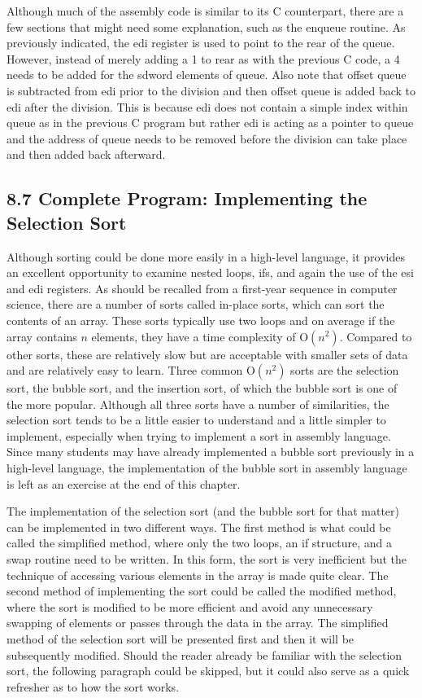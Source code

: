 \documentclass[10pt]{book}
\begin{document}
Although much of the assembly code is similar to its C counterpart, there are a few sections that might need some explanation, such as the enqueue routine. As previously indicated, the edi register is used to point to the rear of the queue. However, instead of merely adding a 1 to rear as with the previous C code, a 4\\

needs to be added for the sdword elements of queue. Also note that offset queue is subtracted from edi prior to the division and then offset queue is added back to edi after the division. This is because edi does not contain a simple index within queue as in the previous C program but rather edi is acting as a pointer to queue and the address of queue needs to be removed before the division can take place and then added back afterward.


\subsection*{8.7 Complete Program: Implementing the Selection Sort}
Although sorting could be done more easily in a high-level language, it provides an excellent opportunity to examine nested loops, ifs, and again the use of the esi and edi registers. As should be recalled from a first-year sequence in computer science, there are a number of sorts called in-place sorts, which can sort the contents of an array. These sorts typically use two loops and on average if the array contains $n$ elements, they have a time complexity of $\mathrm{O}\left(n^{2}\right)$. Compared to other sorts, these are relatively slow but are acceptable with smaller sets of data and are relatively easy to learn. Three common $\mathrm{O}\left(n^{2}\right)$ sorts are the selection sort, the bubble sort, and the insertion sort, of which the bubble sort is one of the more popular. Although all three sorts have a number of similarities, the selection sort tends to be a little easier to understand and a little simpler to implement, especially when trying to implement a sort in assembly language. Since many students may have already implemented a bubble sort previously in a high-level language, the implementation of the bubble sort in assembly language is left as an exercise at the end of this chapter.

The implementation of the selection sort (and the bubble sort for that matter) can be implemented in two different ways. The first method is what could be called the simplified method, where only the two loops, an if structure, and a swap routine need to be written. In this form, the sort is very inefficient but the technique of accessing various elements in the array is made quite clear. The second method of implementing the sort could be called the modified method, where the sort is modified to be more efficient and avoid any unnecessary swapping of elements or passes through the data in the array. The simplified method of the selection sort will be presented first and then it will be subsequently modified. Should the reader already be familiar with the selection sort, the following paragraph could be skipped, but it could also serve as a quick refresher as to how the sort works.
\end{document}
